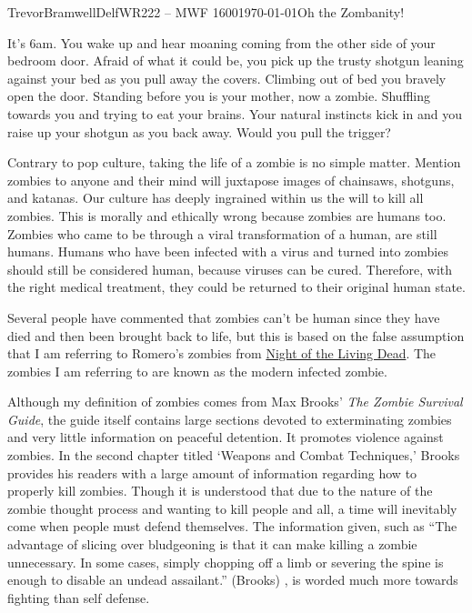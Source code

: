 \documentclass[12pt,letterpaper]{article}
\begin{document}
\begin{mla}{Trevor}{Bramwell}{Delf}{WR222 -- MWF 1600}{\today}{Oh the Zombanity!}

It's 6am. You wake up and hear moaning coming from the other side of your
bedroom door. Afraid of what it could be, you pick up the trusty shotgun
leaning against your bed as you pull away the covers. Climbing out of bed
you bravely open the door. Standing before you is your mother, now a zombie.
Shuffling towards you and trying to eat your brains. Your natural instincts
kick in and you raise up your shotgun as you back away.
Would you pull the trigger?

Contrary to pop culture, taking the life of a zombie is no simple matter.
Mention zombies to anyone and their mind will juxtapose images of
chainsaws, shotguns, and katanas. Our culture has deeply ingrained within us
the will to kill all zombies. This is morally and ethically wrong
because zombies are humans too. Zombies who came to be through a viral
transformation of a human, are still humans.\label{thesis}  
Humans who have been infected with a virus and turned into zombies should
still be considered human, because viruses can be cured. Therefore, with the
right medical treatment, they could be returned to their original human state.

Several people have commented that zombies can't be human since they have died
and then been brought back to life, but this is based on the false assumption
that I am referring to Romero's zombies from \underline{Night of the
Living Dead}. The zombies I am referring to are known as the modern infected
zombie.

Although my definition of zombies comes from Max Brooks'
\emph{The Zombie Survival Guide}, the guide itself contains large sections
devoted to exterminating zombies and very little information on peaceful
detention.  It promotes violence against zombies.
In the second chapter titled `Weapons and Combat Techniques,'
Brooks provides his readers with a large amount of
information regarding how to properly kill zombies. Though it is understood
that due to the nature of the zombie thought process and wanting to kill people
and all, a time will inevitably come when people must defend themselves. The
information given, such as ``The advantage of slicing over bludgeoning is that
it can make killing a zombie unnecessary. In some cases, simply chopping off a
limb or severing the spine is enough to disable an undead assailant.'' (Brooks)
, is worded much more towards fighting than self defense. 


\end{mla}
\end{document}
